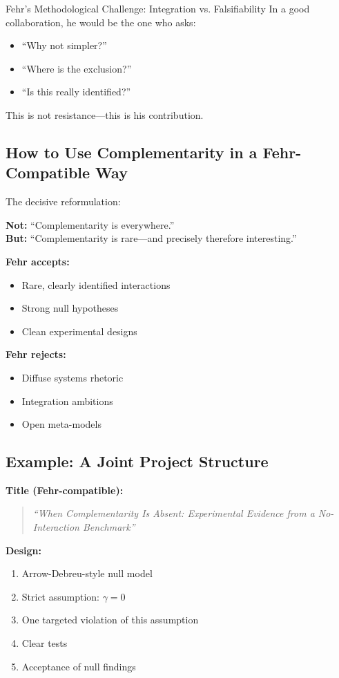 \begin{chapter}{Fehr's Methodological Challenge: Integration vs. Falsifiability}
In a good collaboration, he would be the one who asks:
\begin{itemize}[noitemsep]
    \item ``Why not simpler?''
    \item ``Where is the exclusion?''
    \item ``Is this really identified?''
\end{itemize}

This is not resistance---this is his contribution.

\subsection{How to Use Complementarity in a Fehr-Compatible Way}

The decisive reformulation:

\begin{center}
\textbf{Not:} ``Complementarity is everywhere.''\\[0.5em]
\textbf{But:} ``Complementarity is rare---and precisely therefore interesting.''
\end{center}

\textbf{Fehr accepts:}
\begin{itemize}[noitemsep]
    \item Rare, clearly identified interactions
    \item Strong null hypotheses
    \item Clean experimental designs
\end{itemize}

\textbf{Fehr rejects:}
\begin{itemize}[noitemsep]
    \item Diffuse systems rhetoric
    \item Integration ambitions
    \item Open meta-models
\end{itemize}

\subsection{Example: A Joint Project Structure}

\textbf{Title (Fehr-compatible):}
\begin{quote}
\textit{``When Complementarity Is Absent: Experimental Evidence from a No-Interaction Benchmark''}
\end{quote}

\textbf{Design:}
\begin{enumerate}
    \item Arrow-Debreu-style null model
    \item Strict assumption: $\gamma = 0$
    \item One targeted violation of this assumption
    \item Clear tests
    \item Acceptance of null findings
\end{enumerate}


\end{chapter}
